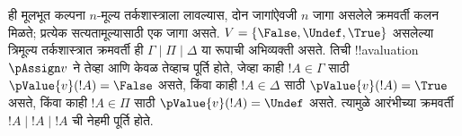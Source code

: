 \documentclass[../../../include/open-logic-section]{subfiles}
\begin{document}
ही मूलभूत कल्पना $n$-मूल्य तर्कशास्त्राला लावल्यास, दोन जागांऐवजी
$n$ जागा असलेले क्रमवर्ती कलन मिळते; प्रत्येक सत्यतामूल्यासाठी
एक जागा असते. $V = \{\False, \Undef, \True\}$ असलेल्या त्रिमूल्य
तर्कशास्त्रात क्रमवर्ती ही $\Gamma \mid \Pi \mid \Delta$ या रूपाची
अभिव्यक्ती असते. तिची !!a{valuation}~$\pAssign v$ ने तेव्हा आणि
केवळ तेव्हाच पूर्ति होते, जेव्हा काही $!A \in \Gamma$ साठी
$\pValue{v}(!A) = \False$ असते, किंवा काही $!A \in \Delta$ साठी
$\pValue{v}(!A) = \True$ असते, किंवा काही $!A \in \Pi$ साठी
$\pValue{v}(!A) = \Undef$ असते. त्यामुळे आरंभीच्या क्रमवर्ती
$!A \mid !A \mid !A$ ची नेहमी पूर्ति होते.
\end{document}
